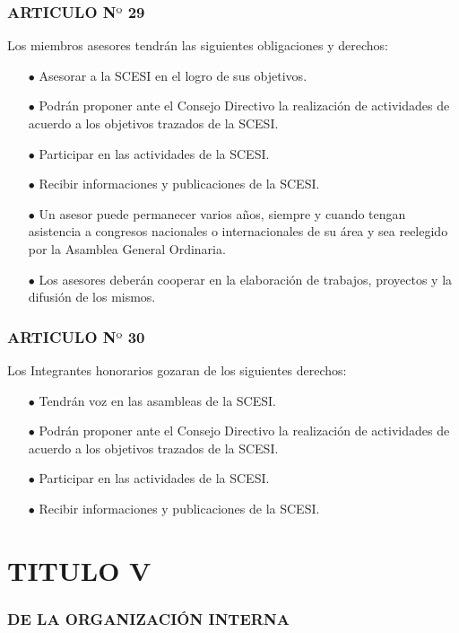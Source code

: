 \documentclass[letterpaper,11pt]{book}
\begin{document}
\subsubsection*{ARTICULO N$º$ 29}
Los miembros asesores tendrán las siguientes obligaciones y derechos: 
\begin{itemize}
\item[$\bullet$] Asesorar a la SCESI en el logro de sus objetivos. 
\item[$\bullet$] Podrán proponer ante el Consejo Directivo la realización de actividades de acuerdo a los objetivos trazados de la SCESI. 
\item[$\bullet$] Participar en las actividades de la SCESI. 
\item[$\bullet$] Recibir informaciones y publicaciones de la SCESI. 
\item[$\bullet$] Un asesor puede permanecer varios años, siempre y cuando tengan asistencia a congresos nacionales o internacionales de su área y sea reelegido por la Asamblea General Ordinaria. 
\item[$\bullet$] Los asesores deberán cooperar en la elaboración de trabajos, proyectos y la difusión de los mismos. 
\end{itemize}
\subsubsection*{ARTICULO N$º$ 30}
Los Integrantes honorarios gozaran de los siguientes derechos: 
\begin{itemize}
\item[$\bullet$] Tendrán voz en las asambleas de la SCESI.  
\item[$\bullet$] Podrán proponer ante el Consejo Directivo la realización de actividades de acuerdo a los objetivos trazados de la SCESI. 
\item[$\bullet$] Participar en las actividades de la SCESI. 
\item[$\bullet$] Recibir informaciones y publicaciones de la SCESI. 
\end{itemize}
\section*{TITULO V}
\subsubsection*{DE LA ORGANIZACIÓN INTERNA}
\end{document}
